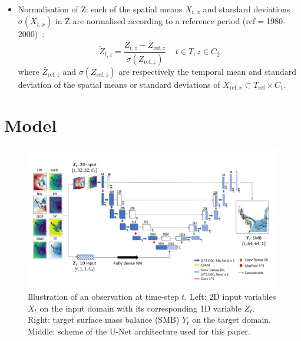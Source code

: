 \documentclass[a4paper,11pt,oneside]{report}
\begin{document}
\begin{itemize}
\begin{itemize}
\item Normalisation of Z: each of the spatial means $\bar{X}_{t,x}$ and standard deviations $\sigma(X_{t,x})$ in Z are normalised according to a reference period ($\mathrm{ref}=$1980-2000)~\cite{Doury}:
\begin{equation}\label{eq:normalisation-Z}
    \tilde{Z}_{t,z} = \frac{Z_{t,z}-\bar{Z}_{\mathrm{\mathrm{ref}},z}}{\sigma(Z_{\mathrm{ref},z})} \;\;\;\; t\in T, z\in C_2
\end{equation}
where $\bar{Z}_{\mathrm{ref},z}$ and $\sigma(Z_{\mathrm{ref},z})$ are respectively the temporal mean and standard deviation of the spatial means or standard deviations of $X_{\mathrm{ref}, x} \subset T_{\mathrm{ref}}\times C_1$.
\end{itemize}



\end{itemize}




\section{Model}\label{sec:model}

\begin{figure}[!t]
  \centering
  \includegraphics[width=\columnwidth]{doc/Thesis-latex/images/unet-with-data.pdf}
  \caption []{\small Illustration of an observation at time-step $t$. Left: 2D input variables $X_t$ on the input domain with its corresponding 1D variable $Z_t$. Right: target surface mass balance (SMB) $Y_t$ on the target domain. Middle: scheme of the U-Net architecture used for this paper. }
  \vspace{-3mm}
  \label{fig:example-features}
\end{figure}
\end{document}
